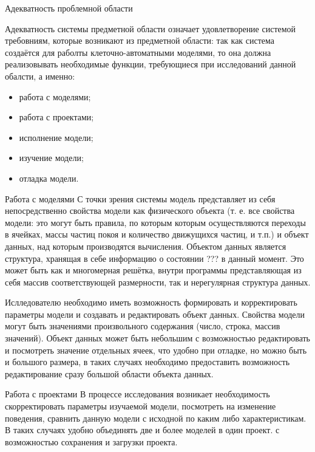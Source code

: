 \documentclass[a4paper,12pt]{extarticle}
\begin{document}
\begin{subsection}{Адекватность проблемной области}
    \label{sec:requirements-adequacy}

    Адекватность системы предметной области означает удовлетворение системой требовниям, которые возникают из предметной области: так как система создаётся для раболты клеточно-автоматными моделями, то она должна реализовывать необходимые функции, требующиеся при исследований данной обалсти, а именно:
    \begin{itemize}
        \item работа с моделями;
        \item работа с проектами;
        \item исполнение модели;
        \item изучение модели;
        \item отладка модели.
    \end{itemize}

    \begin{subsubsection}{Работа с моделями}
        С точки зрения системы модель представляет из себя непосредственно свойства модели как физического объекта (т. е. все свойства модели: это могут быть правила, по которым которым осуществляются переходы в ячейках, массы частиц покоя и количество движущихся частиц, и т.п.) и объект данных, над которым производятся вычисления. Объектом данных является структура, хранящая в себе информацию о состоянии ??? в данный момент. Это может быть как и многомерная решётка, внутри программы представляющая из себя массив соответствующей размерности, так и нерегулярная структура данных.
        
        Ислледователю необходимо иметь возможность формировать и корректировать параметры модели и создавать и редактировать объект данных. Свойства модели могут быть значениями произвольного содержания (число, строка, массив значений). Объект данных может быть небольшим с возможностью редактировать и посмотреть значение отдельных ячеек, что удобно при отладке, но можно быть и большого размера, в таких случаях необходимо предоставить возможность редактирование сразу большой области объекта данных.
    \end{subsubsection}
        
    \begin{subsubsection}{Работа с проектами}
        В процессе исследования возникает необходимость скорректировать параметры изучаемой модели, посмотреть на изменение поведения, сравнить данную модели с исходной по каким либо характеристикам. В таких случаях удобно объединять две и более моделей в один проект. с возможностью сохранения и загрузки проекта. 
        

\end{subsubsection}
\end{subsection}
\end{document}
